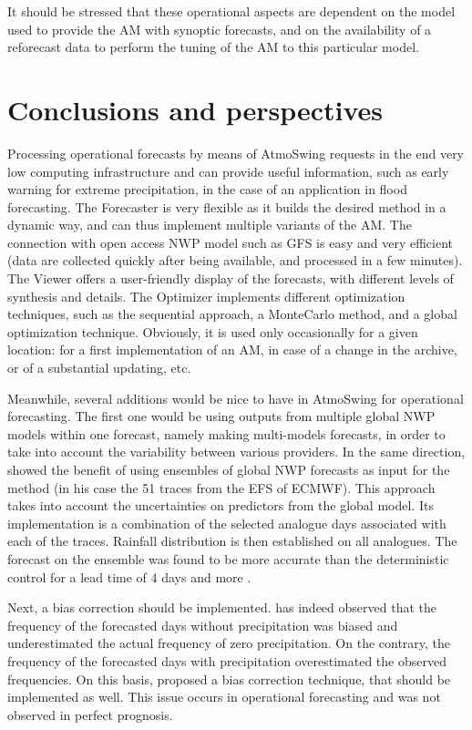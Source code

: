 \documentclass[review]{elsarticle}
\begin{document}
It should be stressed that these operational aspects are dependent on the model used to provide the AM with synoptic forecasts, and on the availability of a reforecast data to perform the tuning of the AM to this particular model.


\section{Conclusions and perspectives}
\label{sec:conclusions}

Processing operational forecasts by means of AtmoSwing requests in the end very low computing infrastructure and can provide useful information, such as early warning for extreme precipitation, in the case of an application in flood forecasting. The Forecaster is very flexible as it builds the desired method in a dynamic way, and can thus implement multiple variants of the AM. The connection with open access NWP model such as GFS is easy and very efficient (data are collected quickly after being available, and processed in a few minutes). The Viewer offers a user-friendly display of the forecasts, with different levels of synthesis and details. The Optimizer implements different optimization techniques, such as the sequential approach, a Monte\textendash Carlo method, and a global optimization technique. Obviously, it is used only occasionally for a given location: for a first implementation of an AM, in case of a change in the archive, or of a substantial updating, etc.

Meanwhile, several additions would be nice to have in AtmoSwing for operational forecasting. The first one would be using outputs from multiple global NWP models within one forecast, namely making multi-models forecasts, in order to take into account the variability between various providers. In the same direction, \citet{Thevenot2004} showed the benefit of using ensembles of global NWP forecasts as input for the method (in his case the 51 traces from the EFS of ECMWF). This approach takes into account the uncertainties on predictors from the global model. Its implementation is a combination of the selected analogue days associated with each of the traces. Rainfall distribution is then established on all analogues. The forecast on the ensemble was found to be more accurate than the deterministic control for a lead time of 4 days and more \citep{Thevenot2004}. 

Next, a bias correction should be implemented. \citet{Marty2010} has indeed observed that the frequency of the forecasted days without precipitation was biased and underestimated the actual frequency of zero precipitation. On the contrary, the frequency of the forecasted days with precipitation overestimated the observed frequencies. On this basis, \citet{Marty2010} proposed a bias correction technique, that should be implemented as well. This issue occurs in operational forecasting and was not observed in perfect prognosis.
\end{document}
